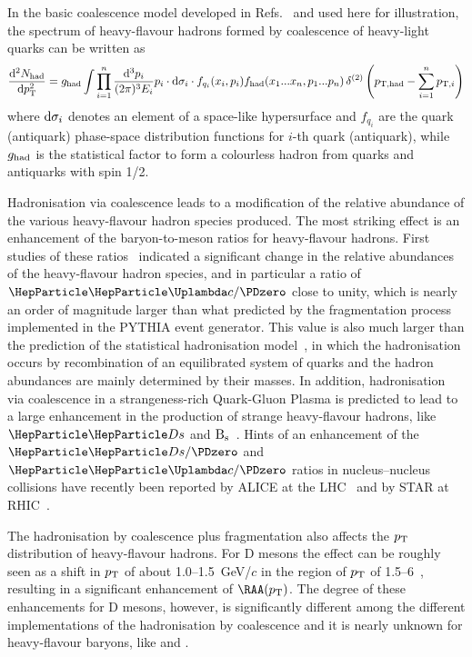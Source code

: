 In the basic coalescence model developed in Refs.~\cite{Greco:2003mm,Greco:2003vf,Fries:2003kq,Fries:2003vb,Oh:2009zj,Minissale:2015zwa,Plumari:2017ntm} and used here for illustration,
the spectrum of heavy-flavour hadrons formed by coalescence of heavy-light quarks can be written as
\begin{equation}
\label{eq-coal}
\frac{{\rm d}^{2}N_{\rm had}}{{\rm d}\pT^{2}}
= g_{\rm had} \int \prod^{n}_{i=1} \frac{{\rm d}^{3}p_{i}}{(2\pi)^{3}E_{i}} p_{i} 
\cdot {\rm d}\sigma_{i}  \cdot f_{q_i}(x_{i}, p_{i})  
f_{\rm had}(x_{1}...x_{n}, p_{1}...p_{n})\, 
\delta^{(2)} \left(p_{\rm T,had}-\sum^{n}_{i=1} p_{{\rm T},i}\right)
\end{equation}
where ${\rm d}\sigma_{i}$ denotes an element of a space-like hypersurface and $f_{q_i}$ are the quark (antiquark)
phase-space distribution functions for $i$-th quark (antiquark), while $g_{\rm had}$ is the statistical factor
to form a colourless hadron from quarks and antiquarks with spin 1/2.

Hadronisation via coalescence leads to a modification of the relative abundance of the
various heavy-flavour hadron species produced. 
The most striking effect is an enhancement of the baryon-to-meson ratios for heavy-flavour hadrons.
First studies of these ratios~\cite{Oh:2009zj,Plumari:2017ntm} indicated a significant change in the relative abundances of the heavy-flavour hadron species, and in particular a ratio of $\PGLc/\PDzero$ close to unity, which
is nearly an order of magnitude larger than what predicted by the fragmentation
process implemented in the PYTHIA event generator. 
This value is also much larger than the
prediction of the statistical hadronisation model~\cite{Andronic:2007zu}, in which the hadronisation occurs by recombination of an equilibrated system of quarks and the hadron abundances are mainly determined by their masses.
In addition, hadronisation via coalescence in a strangeness-rich Quark-Gluon Plasma is predicted to lead to a large enhancement in the production of strange heavy-flavour hadrons, like $\PDs$ and $\rm B_s$~\cite{Kuznetsova:2006hx,He:2014cla,Song:2015ykw}.
Hints of an enhancement of the $\PDs/\PDzero$ and $\PGLc/\PDzero$ ratios in nucleus--nucleus collisions have recently been reported by ALICE at the LHC~\cite{Acharya:2018hre,Peng:2018pwj} and by STAR at RHIC~\cite{Radhakrishnan:2018xxx}.

The hadronisation by coalescence plus fragmentation also affects the $p\sb{\scriptstyle\mathrm{T}}$ distribution  of heavy-flavour hadrons. For D mesons the effect can be roughly seen as a
shift in $p\sb{\scriptstyle\mathrm{T}}$ of about 1.0--1.5~GeV/$c$ in the region of $p\sb{\scriptstyle\mathrm{T}}$ of 1.5--6~\UGeVc, resulting in a
significant enhancement of $\RAA(\pT)$. The degree of these enhancements for D mesons, however, is
significantly different  among the different implementations of the hadronisation
by coalescence and it is nearly unknown for heavy-flavour baryons, like \PGLb and \PGLc.

